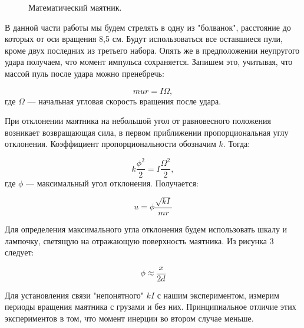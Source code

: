 \documentclass[a4paper, 12pt]{article}%
\begin{document}
\begin{figure}[h!]
\caption{Математический маятник.}
\end{figure}

В данной части работы мы будем стрелять в одну из "болванок", расстояние до которых от оси вращения 8,5 см. Будут использоваться все оставшиеся пули, кроме двух последних из третьего набора. Опять же в предположении неупругого удара получаем, что момент импульса сохраняется. Запишем это, учитывая, что массой пуль после удара можно пренебречь:

\[mur=I\Omega,\]
где $\Omega$ --- начальная угловая скорость вращения после удара.

При отклонении маятника на небольшой угол от равновесного положения возникает возвращающая сила, в первом приближении пропорциональная углу отклонения. Коэффициент пропорциональности обозначим $k$. Тогда:

\[k\frac{\phi^2}{2}=I\frac{\Omega^2}{2},\]
где $\phi$ --- максимальный угол отклонения. Получается:

\[u=\phi\frac{\sqrt{kI}}{mr}\]

Для определения максимального угла отклонения будем использовать шкалу и лампочку, светящую на отражающую поверхность маятника. Из рисунка 3 следует:

\[\phi\approx\frac{x}{2d}\]

Для установления связи "непонятного" $kI$ с нашим экспериментом, измерим периоды вращения маятника с грузами и без них. Принципиальное отличие этих экспериментов в том, что момент инерции во втором случае меньше.
\end{document}
